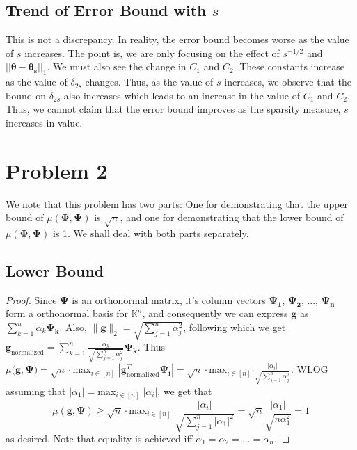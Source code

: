 \documentclass[a4paper,11pt]{article}
\numberwithin{definition}{section}
\numberwithin{mytheorem}{subsection}
\begin{document}
\subsection{Trend of Error Bound with $s$}
This is not a discrepancy. In reality, the error bound becomes worse as the value of $s$ increases. The point is, we are only focusing on the effect of $s^{-1/2}$ and $||\boldsymbol{\theta}-\boldsymbol{\theta_s}||_1$. We must also see the change in $C_1$ and $C_2$. These constants increase as the value of $\delta_{2s}$ changes. Thus, as the value of $s$ increases, we observe that the bound on $\delta_{2s}$ also increases which leads to an increase in the value of $C_1$ and $C_2$. Thus, we cannot claim that the error bound improves as the sparsity measure, $s$ increases in value.


\section{Problem 2}
We note that this problem has two parts: One for demonstrating that the upper bound of $\mu(\boldsymbol{\Phi, \Psi})$ is $\sqrt{n}$, and one for demonstrating that the lower bound of $\mu(\boldsymbol{\Phi, \Psi})$ is 1. We shall deal with both parts separately.\\
\subsection{Lower Bound}
\begin{proof}
Since $\boldsymbol{\Psi}$ is an orthonormal matrix, it's column vectors $\boldsymbol{\Psi_1}$, $\boldsymbol{\Psi_2}$, ..., $\boldsymbol{\Psi_n}$ form a orthonormal basis for $\mathbb{K}^n$, and consequently we can express $\boldsymbol{g}$ as $\sum_{k=1}^{n} \alpha_k\boldsymbol{\Psi_k}$. Also, $\lVert \boldsymbol{g}\rVert_2 = \sqrt{\sum_{j=1}^{n} \alpha^2_j}$, following which we get $\boldsymbol{g}_{\mathrm{normalized}} = \sum_{k=1}^{n} \frac{\alpha_k}{\sqrt{\sum_{j=1}^{n} \alpha^2_j}}\boldsymbol{\Psi_k}$. Thus $\mu(\boldsymbol{g, \Psi)} = \sqrt{n}\cdot\mathrm{max}_{i\in[n]}\;|\boldsymbol{g}_{\mathrm{normalized}}^T\boldsymbol{\Psi_i}| = \sqrt{n}\cdot\mathrm{max}_{i\in[n]}\;\frac{|\alpha_i|}{\sqrt{\sum_{j=1}^{n} \alpha^2_j}}$. WLOG assuming that $|\alpha_1| = \mathrm{max}_{i\in[n]}\;|\alpha_i|$, we get that
$$\mu(\boldsymbol{g, \Psi}) \geq \sqrt{n}\cdot\mathrm{max}_{i\in[n]}\;\frac{|\alpha_i|}{\sqrt{\sum_{j=1}^{n} |\alpha_1|^2}} = \sqrt{n}\frac{|\alpha_1|}{\sqrt{n\alpha^2_1}} = 1$$
as desired. Note that equality is achieved iff $\alpha_1 = \alpha_2 = ... = \alpha_n$.
\end{proof}
\end{document}
